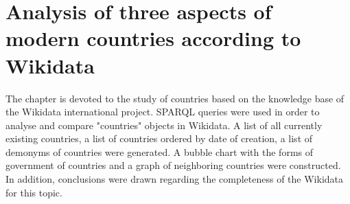\setchapterpreamble[u]{\margintoc}
\chapter{Analysis of three aspects of modern countries according to Wikidata}


The chapter is devoted to the study of countries based on the knowledge base of the Wikidata international project. SPARQL queries were used in order to analyse and compare "countries" objects in Wikidata. A list of all currently existing countries, a list of countries ordered by date of creation, a list of demonyms of countries were generated. A bubble chart with the forms of government of countries and a graph of neighboring countries were constructed. In addition, conclusions were drawn regarding the completeness of the Wikidata for this topic.